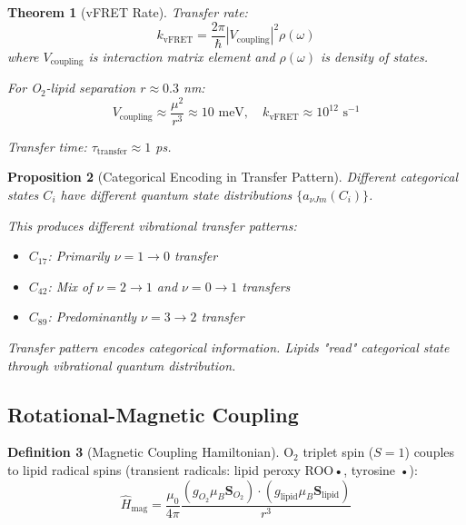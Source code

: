 \documentclass[11pt,a4paper]{article}
\newtheorem{theorem}{Theorem}[section]
\newtheorem{proposition}[theorem]{Proposition}
\theoremstyle{definition}
\newtheorem{definition}[theorem]{Definition}
\theoremstyle{remark}
\begin{document}
\begin{theorem}[vFRET Rate]
Transfer rate:
\begin{equation}
k_{\text{vFRET}} = \frac{2\pi}{\hbar} |V_{\text{coupling}}|^2 \rho(\omega)
\end{equation}
where $V_{\text{coupling}}$ is interaction matrix element and $\rho(\omega)$ is density of states.

For O$_2$-lipid separation $r \approx 0.3$ nm:
\begin{equation}
V_{\text{coupling}} \approx \frac{\mu^2}{r^3} \approx 10 \text{ meV}, \quad k_{\text{vFRET}} \approx 10^{12} \text{ s}^{-1}
\end{equation}

Transfer time: $\tau_{\text{transfer}} \approx 1$ ps.
\end{theorem}

\begin{proposition}[Categorical Encoding in Transfer Pattern]
Different categorical states $C_i$ have different quantum state distributions $\{a_{\nu Jm}(C_i)\}$.

This produces different vibrational transfer patterns:
\begin{itemize}
\item $C_{17}$: Primarily $\nu=1 \to 0$ transfer
\item $C_{42}$: Mix of $\nu=2 \to 1$ and $\nu=0 \to 1$ transfers
\item $C_{89}$: Predominantly $\nu=3 \to 2$ transfer
\end{itemize}

Transfer pattern encodes categorical information. Lipids "read" categorical state through vibrational quantum distribution.
\end{proposition}

\subsection{Rotational-Magnetic Coupling}

\begin{definition}[Magnetic Coupling Hamiltonian]
O$_2$ triplet spin ($S=1$) couples to lipid radical spins (transient radicals: lipid peroxy ROO•, tyrosine •):
\begin{equation}
\hat{H}_{\text{mag}} = \frac{\mu_0}{4\pi} \frac{(g_{O_2}\mu_B \mathbf{S}_{O_2}) \cdot (g_{\text{lipid}}\mu_B \mathbf{S}_{\text{lipid}})}{r^3}
\end{equation}
\end{definition}
\end{document}
